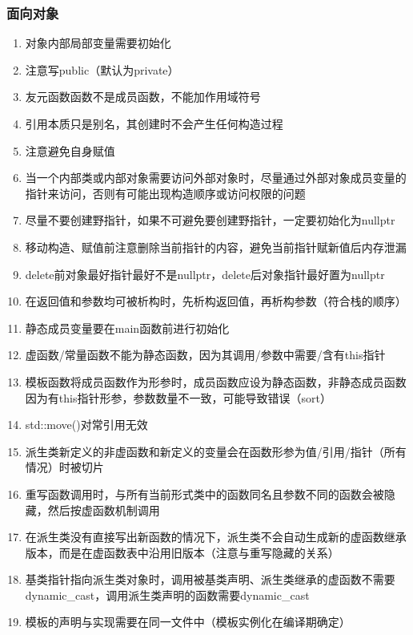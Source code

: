 \documentclass[onecolumn]{article}
\begin{document}
        \subsubsection{面向对象}
            \noindent
            \begin{enumerate}
                \item 对象内部局部变量需要初始化
                \item 注意写public（默认为private）
                \item 友元函数函数不是成员函数，不能加作用域符号
                \item 引用本质只是别名，其创建时不会产生任何构造过程
                \item 注意避免自身赋值
                \item 当一个内部类或内部对象需要访问外部对象时，尽量通过外部对象成员变量的指针来访问，否则有可能出现构造顺序或访问权限的问题
                \item 尽量不要创建野指针，如果不可避免要创建野指针，一定要初始化为nullptr
                \item 移动构造、赋值前注意删除当前指针的内容，避免当前指针赋新值后内存泄漏
                \item delete前对象最好指针最好不是nullptr，delete后对象指针最好置为nullptr
                \item 在返回值和参数均可被析构时，先析构返回值，再析构参数（符合栈的顺序）
                \item 静态成员变量要在main函数前进行初始化
                \item 虚函数/常量函数不能为静态函数，因为其调用/参数中需要/含有this指针
                \item 模板函数将成员函数作为形参时，成员函数应设为静态函数，非静态成员函数因为有this指针形参，参数数量不一致，可能导致错误（sort）
                \item std::move()对常引用无效
                \item 派生类新定义的非虚函数和新定义的变量会在函数形参为值/引用/指针（所有情况）时被切片
                \item 重写函数调用时，与所有当前形式类中的函数同名且参数不同的函数会被隐藏，然后按虚函数机制调用
                \item 在派生类没有直接写出新函数的情况下，派生类不会自动生成新的虚函数继承版本，而是在虚函数表中沿用旧版本（注意与重写隐藏的关系）
                \item 基类指针指向派生类对象时，调用被基类声明、派生类继承的虚函数不需要dynamic\_cast，调用派生类声明的函数需要dynamic\_cast
                \item 模板的声明与实现需要在同一文件中（模板实例化在编译期确定）
            \end{enumerate}
\end{document}
